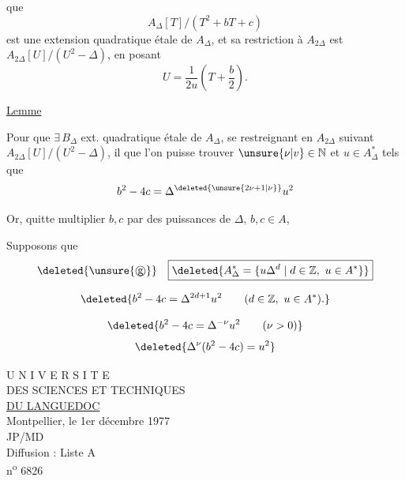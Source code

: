 que
\[
A_{\Delta}[T]/(T^2+bT+c)
\]
est une extension quadratique étale de $A_{\Delta}$, et sa restriction à $A_{2\Delta}$ est  $A_{2\Delta}[U]/(U^2-\Delta)$, en posant
\[
U=\frac{1}{2u}\left(T+\frac b2\right).
\]


\uline{Lemme}  

Pour que $\exists\, B_{\Delta}$ ext. quadratique étale de $A_{\Delta}$, se restreignant en $A_{2\Delta}$ suivant $A_{2\Delta}[U]/(U^2-\Delta)$, il  que l'on puisse trouver  $\unsure{\nu|v}\in\mathbb N$ et \uline{$u\in A_{\Delta}^{*}$} tels que
\[
b^2-4c=\Delta^{\deleted{\unsure{2\nu+1|\nu}}}u^2
\]

Or, quitte  multiplier $b,c$ par des puissances  de $\Delta$,   $b,c\in A$,  

 Supposons que 
\[
\deleted{\unsure{\text{\textcircled{g}}}}\quad\boxed{\deleted{A_{\Delta}^{*}=\{u\Delta^d\mid d\in\mathbb Z,\ u\in A^*\}}}
\]

\[
\deleted{b^2-4c=\Delta^{2d+1}u^2\qquad(d\in\mathbb Z,\ u\in A^*).}
\]

\[
\deleted{b^2-4c=\Delta^{-\nu}u^2\qquad(\nu>0)}
\]
\[
\deleted{\Delta^\nu(b^2-4c)=u^2}
\]

U N I V E R S I T E\\ DES SCIENCES ET TECHNIQUES\\ \uline{DU LANGUEDOC}\\
Montpellier, le 1er décembre 1977\\

JP/MD\\ Diffusion : Liste A\\ n\textsuperscript{o} 6826

